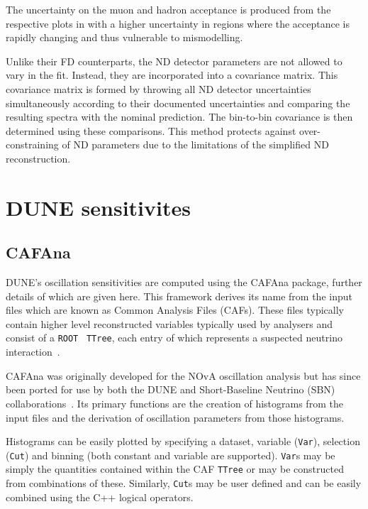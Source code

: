 The uncertainty on the muon and hadron acceptance is produced from the respective plots in  with a higher uncertainty in regions where the acceptance is rapidly changing and thus vulnerable to mismodelling.

Unlike their FD counterparts, the ND detector parameters are not allowed to vary in the fit.
Instead, they are incorporated into a covariance matrix.
This covariance matrix is formed by throwing all ND detector uncertainties simultaneously according to their documented uncertainties and comparing the resulting spectra with the nominal prediction.
The bin-to-bin covariance is then determined using these comparisons.
This method protects against over-constraining of ND parameters due to the limitations of the simplified ND reconstruction.

\section{DUNE sensitivites}
\label{sec:dune_lbl:sensitivities}

\subsection{CAFAna}
\label{sec:dune_lbl:sensitivities:cafana}

DUNE's oscillation sensitivities are computed using the CAFAna package, further details of which are given here.
This framework derives its name from the input files which are known as Common Analysis Files (CAFs).
These files typically contain higher level reconstructed variables typically used by analysers and consist of a \texttt{ROOT}~\cite{root} \texttt{TTree}, each entry of which represents a suspected neutrino interaction~\cite{backhouse2015}.

CAFAna was originally developed for the NOvA oscillation analysis but has since been ported for use by both the DUNE and Short-Baseline Neutrino (SBN) collaborations~\cite{cafana}.
Its primary functions are the creation of histograms from the input files and the derivation of oscillation parameters from those histograms.

Histograms can be easily plotted by specifying a dataset, variable (\texttt{Var}), selection (\texttt{Cut}) and binning (both constant and variable are supported). 
\texttt{Var}s may be simply the quantities contained within the CAF \texttt{TTree} or may be constructed from combinations of these.
Similarly, \texttt{Cut}s may be user defined and can be easily combined using the C++ logical operators.

